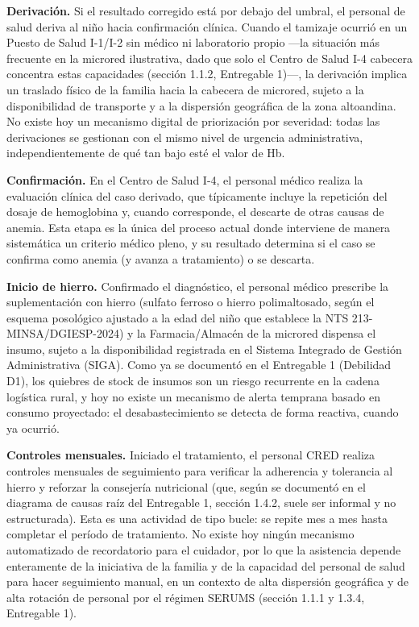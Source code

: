 \documentclass[11pt,a4paper]{article}
\begin{document}
\textbf{Derivación.} Si el resultado corregido está por debajo del umbral, el personal de salud deriva al niño hacia confirmación clínica. Cuando el tamizaje ocurrió en un Puesto de Salud I-1/I-2 sin médico ni laboratorio propio ---la situación más frecuente en la microred ilustrativa, dado que solo el Centro de Salud I-4 cabecera concentra estas capacidades (sección 1.1.2, Entregable 1)---, la derivación implica un traslado físico de la familia hacia la cabecera de microred, sujeto a la disponibilidad de transporte y a la dispersión geográfica de la zona altoandina. No existe hoy un mecanismo digital de priorización por severidad: todas las derivaciones se gestionan con el mismo nivel de urgencia administrativa, independientemente de qué tan bajo esté el valor de Hb.

\textbf{Confirmación.} En el Centro de Salud I-4, el personal médico realiza la evaluación clínica del caso derivado, que típicamente incluye la repetición del dosaje de hemoglobina y, cuando corresponde, el descarte de otras causas de anemia. Esta etapa es la única del proceso actual donde interviene de manera sistemática un criterio médico pleno, y su resultado determina si el caso se confirma como anemia (y avanza a tratamiento) o se descarta.

\textbf{Inicio de hierro.} Confirmado el diagnóstico, el personal médico prescribe la suplementación con hierro (sulfato ferroso o hierro polimaltosado, según el esquema posológico ajustado a la edad del niño que establece la NTS 213-MINSA/DGIESP-2024) y la Farmacia/Almacén de la microred dispensa el insumo, sujeto a la disponibilidad registrada en el Sistema Integrado de Gestión Administrativa (SIGA). Como ya se documentó en el Entregable 1 (Debilidad D1), los quiebres de stock de insumos son un riesgo recurrente en la cadena logística rural, y hoy no existe un mecanismo de alerta temprana basado en consumo proyectado: el desabastecimiento se detecta de forma reactiva, cuando ya ocurrió.

\textbf{Controles mensuales.} Iniciado el tratamiento, el personal CRED realiza controles mensuales de seguimiento para verificar la adherencia y tolerancia al hierro y reforzar la consejería nutricional (que, según se documentó en el diagrama de causas raíz del Entregable 1, sección 1.4.2, suele ser informal y no estructurada). Esta es una actividad de tipo bucle: se repite mes a mes hasta completar el período de tratamiento. No existe hoy ningún mecanismo automatizado de recordatorio para el cuidador, por lo que la asistencia depende enteramente de la iniciativa de la familia y de la capacidad del personal de salud para hacer seguimiento manual, en un contexto de alta dispersión geográfica y de alta rotación de personal por el régimen SERUMS (sección 1.1.1 y 1.3.4, Entregable 1).
\end{document}
